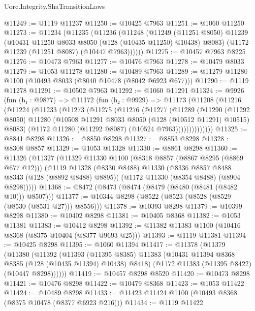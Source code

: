\begin{lexlean}{Uorc.Integrity.ShaTransitionLaws}
\begin{coremodule}
@11249 := @1119 @11237
@11250 := @10425 @7963
@11251 := @1060 @11250
@11273 := @11234
    (@11235
      (@11236
        (@11248
          (@11249
            (@11251 @8050)
            @11239
            (@10431 @11250 @8033 @8050 (@128 (@10435 @11250) @10438) @8083)
            (@1172 @11239 (@11251 @8087) (@10447 @7963))))))
@11275 := @10457 @7963 @8225
@11276 := @10473 @7963
@11277 := @10476 @7963
@11278 := @10479 @8033
@11279 := @1053 @11278
@11280 := @10489 @7963
@11289 := @11279 @11280 @1100 (@10493 @8033 (@8040 @10478 (@8042 @6923 @677)))
@11290 := @1119 @11278
@11291 := @10502 @7963
@11292 := @1060 @11291
@11324 := @9926
    (fun (h₁ : @9877) =>
    @11172
      (fun (h₂ : @9929) =>
      @11173
        (@11208
          (@11216
            (@11224
              (@11233
                (@11273
                  (@11275
                    (@11276
                      (@11277
                        (@11289
                          (@11290
                            (@11292 @8050)
                            @11280
                            (@10508 @11291 @8033 @8050 (@128 (@10512 @11291) @10515) @8083)
                            (@1172 @11280 (@11292 @8087) (@10524 @7963))))))))))))))
@11325 := @8841 @8298
@11326 := @8850 @8298
@11327 := @8853 @8298
@11328 := @8308 @8857
@11329 := @1053 @11328
@11330 := @8861 @8298
@11360 := @11326
    (@11327
      (@11329
        @11330
        @1100
        (@8318 @8857 (@8867 @8295 (@8869 @677 @12)))
        (@1119
          @11328
          (@8330 @8488)
          @11330
          (@8336 @8857 @8488 @8343 (@128 (@8892 @8488) @8895))
          (@1172 @11330 (@8354 @8488) (@8904 @8298)))))
@11368 := @8472 (@8473 (@8474 (@8479 (@8480 (@8481 (@8482 @10))) @8507)))
@11377 := @10344 @8298 (@8522 (@8523 (@8528 (@8529 (@8530 (@8531 @27))) @8556)))
@11378 := @10393 @8298
@11379 := @10399 @8298
@11380 := @10402 @8298
@11381 := @10405 @8368
@11382 := @1053 @11381
@11383 := @10412 @8298
@11392 := @11382 @11383 @1100 (@10416 @8368 (@8375 @10404 (@8377 @9693 @25)))
@11393 := @1119 @11381
@11394 := @10425 @8298
@11395 := @1060 @11394
@11417 := @11378
    (@11379
      (@11380
        (@11392
          (@11393
            (@11395 @8385)
            @11383
            (@10431 @11394 @8368 @8385 (@128 (@10435 @11394) @10438) @8418)
            (@1172 @11383 (@11395 @8422) (@10447 @8298))))))
@11419 := @10457 @8298 @8520
@11420 := @10473 @8298
@11421 := @10476 @8298
@11422 := @10479 @8368
@11423 := @1053 @11422
@11424 := @10489 @8298
@11433 := @11423 @11424 @1100 (@10493 @8368 (@8375 @10478 (@8377 @6923 @216)))
@11434 := @1119 @11422

\end{coremodule}
\end{lexlean}
